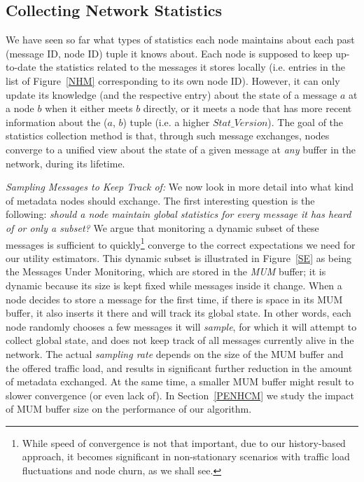 \subsection{Collecting Network Statistics}
\label{NHCM}

We have seen so far what types of statistics each node maintains about each past (message ID, node ID) tuple it knows about. Each node is supposed to keep up-to-date the statistics related to the messages it stores locally (i.e. entries in the list of Figure~\ref{NHM} corresponding to its own node ID). However, it can only update its knowledge (and the respective entry) about the state of a message $a$ at a node $b$ when it either meets $b$ directly, or it meets a node that has more recent information about the ($a$, $b$) tuple (i.e. a higher $Stat\_Version$). The goal of the statistics collection method is that, through such message exchanges, nodes converge to a unified view about the state of a given message at \emph{any} buffer in the network, during its lifetime.

\emph{Sampling Messages to Keep Track of:} We now look in more detail into what kind of metadata nodes should exchange. The first interesting question is the following: \emph{should a node maintain global statistics for \emph{every} message it has heard of or only a subset?} We argue that monitoring a dynamic subset of these messages is sufficient to quickly\footnote{While speed of convergence is not that important, due to our history-based approach, it becomes significant in non-stationary scenarios with traffic load fluctuations and node churn, as we shall see.} converge to the correct expectations we need for our utility estimators. This dynamic subset is illustrated in Figure~\ref{SE} as being the Messages Under Monitoring, which are stored in the \emph{MUM} buffer; it is dynamic because its size is kept fixed while messages inside it change. When a node decides to store a message for the first time, if there is space in its MUM buffer, it also inserts it there and will track its global state.  In other words, each node randomly chooses a few messages it will \emph{sample}, for which it will attempt to collect global state, and does not keep track of all messages currently alive in the network. The actual \emph{sampling rate} depends on the size of the MUM buffer and the offered traffic load, and results in significant further reduction in the amount of metadata exchanged. At the same time, a smaller MUM buffer might result to slower convergence (or even lack of). In Section~\ref{PENHCM} we study the impact of MUM buffer size on the performance of our algorithm.


